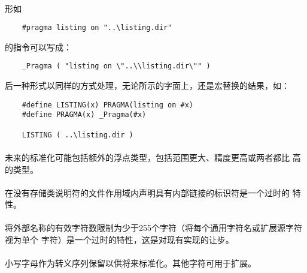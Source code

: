 {\paragraph{}
\ex* 形如
\begin{lstlisting}
    #pragma listing on "..\listing.dir"
\end{lstlisting}
的指令可以写成：
\begin{lstlisting}
    _Pragma ( "listing on \"..\\listing.dir\"" )
\end{lstlisting}
后一种形式以同样的方式处理，无论所示的字面上，还是宏替换的结果，如：
\begin{lstlisting}
    #define LISTING(x) PRAGMA(listing on #x)
    #define PRAGMA(x) _Pragma(#x)

    LISTING ( ..\listing.dir )
\end{lstlisting}

\paragraph{}
未来的标准化可能包括额外的浮点类型，包括范围更大、精度更高或两者都比
高的类型。

\paragraph{}
在没有存储类说明符的文件作用域内声明具有内部链接的标识符是一个过时的
特性。

\paragraph{}
将外部名称的有效字符数限制为少于255个字符（将每个通用字符名或扩展源字符视为单个
字符）是一个过时的特性，这是对现有实现的让步。

\paragraph{}
小写字母作为转义序列保留以供将来标准化。其他字符可用于扩展。

}
